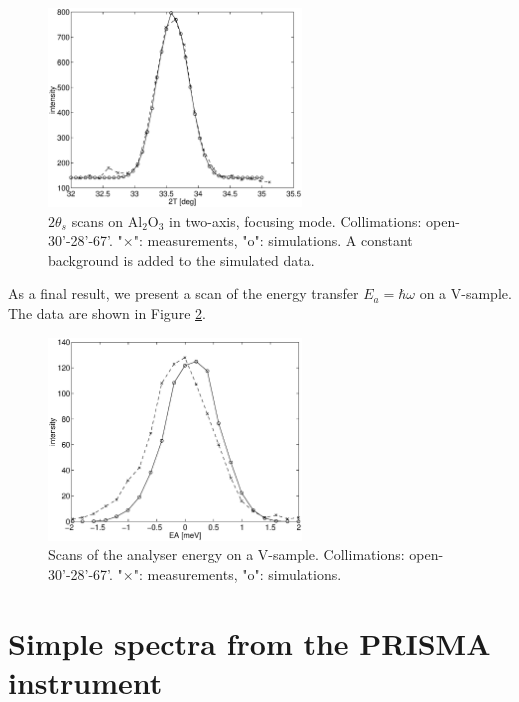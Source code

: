 \begin{figure}
  \begin{center}
    \includegraphics[width=0.6\textwidth]{figures/al2o3-focus.eps}
  \end{center}
\caption{$2\theta_s$ scans on Al$_2$O$_3$ in two-axis, focusing mode.
Collimations: open-30'-28'-67'.
"$\times$": measurements, "o": simulations.  
A constant background is added to the simulated data.}
\label{f:al2o3}
\end{figure}

As a final result, we present a scan of the energy
transfer $E_a = \hbar \omega$ on a V-sample.
The data are shown in Figure \ref{f:v_ea}.

\begin{figure}
  \begin{center}
    \includegraphics[width=0.6\textwidth]{figures/ea-scan.eps}
  \end{center}
\caption{Scans of the analyser energy on a V-sample.
Collimations: open-30'-28'-67'.
"$\times$": measurements, "o": simulations.}
\label{f:v_ea}
\end{figure}


\section{Simple spectra from the PRISMA instrument}
\label{data:PRISMA}

